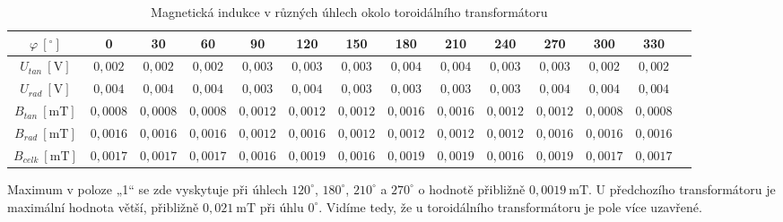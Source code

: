 \documentclass[a4paper,12pt]{article}
\begin{document}
\begin{table}[H]
\centering
\scriptsize
\begin{tabular}{|c|c|c|c|c|c|c|c|c|c|c|c|c|c|}
\hline
$\varphi\ [^\circ]$ 
& 0 & 30 & 60 & 90 & 120 & 150 & 180 & 210 & 240 & 270 & 300 & 330 \\
\hline
$U_{tan}\ [\mathrm{V}]$ 
& $0,002$ & $0,002$ & $0,002$ & $0,003$ & $0,003$ & $0,003$ & $0,004$ & $0,004$ & $0,003$ & $0,003$ & $0,002$ & $0,002$ \\
\hline
$U_{rad}\ [\mathrm{V}]$ 
& $0,004$ & $0,004$ & $0,004$ & $0,003$ & $0,004$ & $0,003$ & $0,003$ & $0,003$ & $0,003$ & $0,004$ & $0,004$ & $0,004$ \\
\hline
$B_{tan}\ [\mathrm{mT}]$ 
& $0,0008$ & $0,0008$ & $0,0008$ & $0,0012$ & $0,0012$ & $0,0012$ & $0,0016$ & $0,0016$ & $0,0012$ & $0,0012$ & $0,0008$ & $0,0008$ \\
\hline
$B_{rad}\ [\mathrm{mT}]$ 
& $0,0016$ & $0,0016$ & $0,0016$ & $0,0012$ & $0,0016$ & $0,0012$ & $0,0012$ & $0,0012$ & $0,0012$ & $0,0016$ & $0,0016$ & $0,0016$ \\
\hline
$B_{celk}\ [\mathrm{mT}]$ 
& $0,0017$ & $0,0017$ & $0,0017$ & $0,0016$ & $0,0019$ & $0,0016$ & $0,0019$ & $0,0019$ & $0,0016$ & $0,0019$ & $0,0017$ & $0,0017$ \\
\hline
\end{tabular}
\caption{Magnetická indukce v různých úhlech okolo toroidálního transformátoru}
\end{table}

Maximum v poloze „1“ se zde vyskytuje při úhlech $120^\circ$, $180^\circ$, $210^\circ$ a $270^\circ$ o hodnotě přibližně $0,0019\ \mathrm{mT}$. U předchozího transformátoru je maximální hodnota větší, přibližně $0,021\ \mathrm{mT}$ při úhlu $0^\circ$. Vidíme tedy, že u toroidálního transformátoru je pole více uzavřené. 
\end{document}

